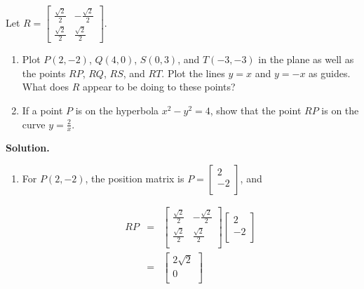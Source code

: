 \documentclass{ximera}
\begin{document}
\begin{example}  \label{rotationmatrixex} Let $R = \left[ \begin{array}{rr} \frac{\sqrt{2}}{2} & -\frac{\sqrt{2}}{2} \\ [3pt] \frac{\sqrt{2}}{2} & \frac{\sqrt{2}}{2} \end{array} \right]$.

\begin{enumerate}

\item Plot $P(2,-2)$, $Q(4,0)$, $S(0,3)$, and $T(-3,-3)$ in the plane as well as the points $RP$, $RQ$, $RS$, and $RT$. Plot the lines $y=x$ and $y=-x$ as guides.  What does $R$ appear to be doing to these points?

\item  If a point $P$ is on the hyperbola $x^2-y^2=4$, show that the point $RP$ is on the curve $y = \frac{2}{x}$.


\end{enumerate}

{\bf Solution.}  \begin{enumerate} \item  For $P(2,-2)$, the position matrix is  $P = \left[ \begin{array}{r} 2 \\ -2 \\ \end{array} \right]$, and 

\[\begin{array}{rcl}

RP & = &  \left[ \begin{array}{rr} \frac{\sqrt{2}}{2} & -\frac{\sqrt{2}}{2} \\ [3pt] \frac{\sqrt{2}}{2} & \frac{\sqrt{2}}{2} \\ \end{array} \right]\left[ \begin{array}{r} 2 \\ [3pt] -2 \\ \end{array} \right] \\ [13pt]

& = & \left[ \begin{array}{r} 2\sqrt{2} \\ 0 \\ \end{array} \right] \\

\end{array}\]


\end{enumerate}
\end{example}
\end{document}
